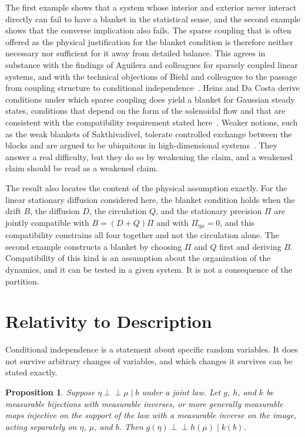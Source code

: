 \documentclass[11pt]{article}
\newtheorem{proposition}{Proposition}
\theoremstyle{definition}
\newcommand{\Ind}{\perp\!\!\!\perp}
\begin{document}
The first example shows that a system whose interior and exterior never interact directly can fail to have a blanket in the statistical sense, and the second example shows that the converse implication also fails. The sparse coupling that is often offered as the physical justification for the blanket condition is therefore neither necessary nor sufficient for it away from detailed balance. This agrees in substance with the findings of Aguilera and colleagues for sparsely coupled linear systems, and with the technical objections of Biehl and colleagues to the passage from coupling structure to conditional independence~\cite{aguilera2022,biehl2021}. Heins and Da Costa derive conditions under which sparse coupling does yield a blanket for Gaussian steady states, conditions that depend on the form of the solenoidal flow and that are consistent with the compatibility requirement stated here~\cite{heins2022}. Weaker notions, such as the weak blankets of Sakthivadivel, tolerate controlled exchange between the blocks and are argued to be ubiquitous in high-dimensional systems~\cite{sakthivadivel2022}. They answer a real difficulty, but they do so by weakening the claim, and a weakened claim should be read as a weakened claim.

The result also locates the content of the physical assumption exactly. For the linear stationary diffusion considered here, the blanket condition holds when the drift $B$, the diffusion $D$, the circulation $Q$, and the stationary precision $\Pi$ are jointly compatible with $B=(D+Q)\Pi$ and with $\Pi_{\eta\mu}=0$, and this compatibility constrains all four together and not the circulation alone. The second example constructs a blanket by choosing $\Pi$ and $Q$ first and deriving $B$. Compatibility of this kind is an assumption about the organization of the dynamics, and it can be tested in a given system. It is not a consequence of the partition.

\section{Relativity to Description}

Conditional independence is a statement about specific random variables. It does not survive arbitrary changes of variables, and which changes it survives can be stated exactly.

\begin{proposition}
Suppose $\eta\Ind\mu\mid b$ under a joint law. Let $g$, $h$, and $k$ be measurable bijections with measurable inverses, or more generally measurable maps injective on the support of the law with a measurable inverse on the image, acting separately on $\eta$, $\mu$, and $b$. Then $g(\eta)\Ind h(\mu)\mid k(b)$.
\end{proposition}
\end{document}
